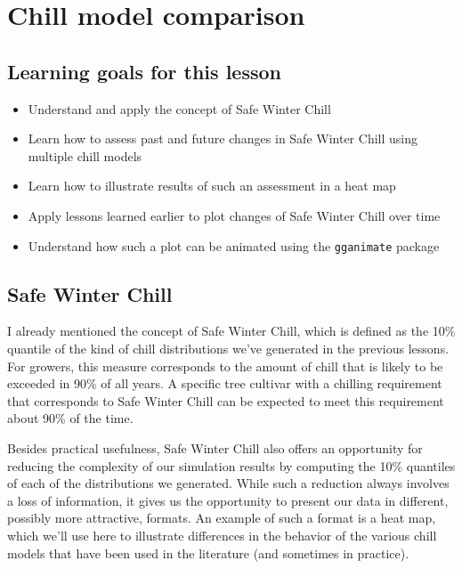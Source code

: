 \documentclass[
]{book}
\providecommand{\tightlist}{%
  \setlength{\itemsep}{0pt}\setlength{\parskip}{0pt}}
\begin{document}
\hypertarget{chill_model_comparison}{%
\chapter{Chill model comparison}\label{chill_model_comparison}}

\hypertarget{goals_chill_model}{%
\section*{Learning goals for this lesson}\label{goals_chill_model}}

\begin{itemize}
\tightlist
\item
  Understand and apply the concept of Safe Winter Chill
\item
  Learn how to assess past and future changes in Safe Winter Chill using multiple chill models
\item
  Learn how to illustrate results of such an assessment in a heat map
\item
  Apply lessons learned earlier to plot changes of Safe Winter Chill over time
\item
  Understand how such a plot can be animated using the \texttt{gganimate} package
\end{itemize}

\hypertarget{safe-winter-chill}{%
\section{Safe Winter Chill}\label{safe-winter-chill}}

I already mentioned the concept of Safe Winter Chill, which is defined as the 10\% quantile of the kind of chill distributions we've generated in the previous lessons. For growers, this measure corresponds to the amount of chill that is likely to be exceeded in 90\% of all years. A specific tree cultivar with a chilling requirement that corresponds to Safe Winter Chill can be expected to meet this requirement about 90\% of the time.

Besides practical usefulness, Safe Winter Chill also offers an opportunity for reducing the complexity of our simulation results by computing the 10\% quantiles of each of the distributions we generated. While such a reduction always involves a loss of information, it gives us the opportunity to present our data in different, possibly more attractive, formats. An example of such a format is a heat map, which we'll use here to illustrate differences in the behavior of the various chill models that have been used in the literature (and sometimes in practice).
\end{document}
